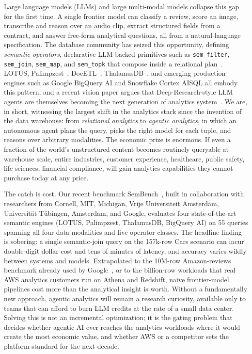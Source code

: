 \documentclass[11pt]{article}
\begin{document}
Large language models (LLMs) and large multi-modal models collapse this gap for the first time. A single frontier model can classify a review, score an image, transcribe and reason over an audio clip, extract structured fields from a contract, and answer free-form analytical questions, all from a natural-language specification. The database community has seized this opportunity, defining \emph{semantic operators}, declarative LLM-backed primitives such as \texttt{sem\_filter}, \texttt{sem\_join}, \texttt{sem\_map}, and \texttt{sem\_topk} that compose inside a relational plan~\cite{patel2024lotus,patel2025lotus}. LOTUS, Palimpzest~\cite{liu2024palimpzest}, DocETL~\cite{shankar2025docetl}, ThalamusDB~\cite{jo2024thalamusdb}, and emerging production engines such as Google BigQuery AI and Snowflake Cortex AISQL all embody this pattern, and a recent vision paper argues that Deep-Research-style LLM agents are themselves becoming the next generation of analytics system~\cite{russo2025deepresearch}. We are, in short, witnessing the largest shift in the analytics stack since the invention of the data warehouse: from \emph{relational analytics} to \emph{agentic analytics}, in which an autonomous agent plans the query, picks the right model for each tuple, and reasons over arbitrary modalities. The economic prize is enormous. If even a fraction of the world's unstructured content becomes routinely queryable at warehouse scale, entire industries, customer experience, healthcare, public safety, life sciences, financial compliance, will gain analytics capabilities they cannot purchase today at any price.

The catch is cost. Our recent benchmark SemBench~\cite{lao2025sembench}, built in collaboration with researchers from Cornell, MIT, Michigan, Vrije Universiteit Amsterdam, Universit{\"a}t T{\"u}bingen, Amsterdam, and Google, evaluates four state-of-the-art semantic engines (LOTUS, Palimpzest, ThalamusDB, BigQuery AI) on 55 queries spanning all four data modalities and five operator classes. The headline finding is sobering: a single semantic-join query on the 157k-row Cars scenario can incur double-digit dollar cost and tens of minutes of latency, and accuracy varies wildly between systems and models. Extrapolated to the 10M-row Amazon-reviews benchmark already used by Google~\cite{chung2026proxy}, or to the billion-row workloads that real AWS analytics customers run on Athena and Redshift, naive frontier-model pipelines cost more than the analytical insight is worth. Without a fundamentally new approach, agentic analytics will remain a research curiosity, available only to teams that can afford to burn LLM credits at the rate of a small data center. Solving this is not an incremental optimization; it is the gating problem that decides whether agentic AI ever reaches the analytics workloads where it would create the most economic value, and whether AWS or a competitor sets the platform standard for the next decade.
\end{document}
